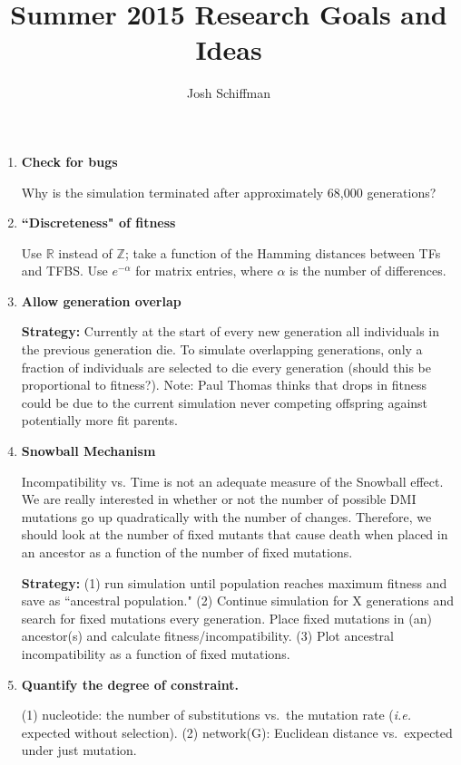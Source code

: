\documentclass[a4paper, 11 pt]{article}
\begin{document}
\title{Summer 2015 Research Goals and Ideas}
\author{Josh Schiffman}
\maketitle

\begin{enumerate}
  \item \textbf{Check for bugs}

    Why is the simulation terminated after approximately 68,000 generations?

  \item \textbf{``Discreteness" of fitness}

    Use $\mathbb{R}$ instead of $\mathbb{Z}$; take a function of the Hamming distances between TFs and TFBS. Use $e^{-\alpha}$ for matrix entries, where $\alpha$ is the number of differences. 


  \item \textbf{Allow generation overlap}

    \textbf{Strategy:} Currently at the start of every new generation all individuals in the previous generation die. To simulate overlapping generations, only a fraction of individuals are selected to die every generation (should this be proportional to fitness?). Note: Paul Thomas thinks that drops in fitness could be due to the current simulation never competing offspring against potentially more fit parents.  

  \item \textbf{Snowball Mechanism}

    Incompatibility vs. Time is not an adequate measure of the Snowball effect. We are really interested in whether or not the number of possible DMI mutations go up quadratically with the number of changes. Therefore, we should look at the number of fixed mutants that cause death when placed in an ancestor as a function of the number of fixed mutations.

    \textbf{Strategy:} (1) run simulation until population reaches maximum fitness and save as ``ancestral population." (2) Continue simulation for X generations and search for fixed mutations every generation. Place fixed mutations in (an) ancestor(s) and calculate fitness/incompatibility. (3) Plot ancestral incompatibility as a function of fixed mutations. 

  \item \textbf{Quantify the degree of constraint.} 
    
    (1) nucleotide: the number of substitutions vs.\ the mutation rate (\emph{i.e.} expected without selection). (2) network(G): Euclidean distance vs.\ expected under just mutation. 


\end{enumerate}
\end{document}
